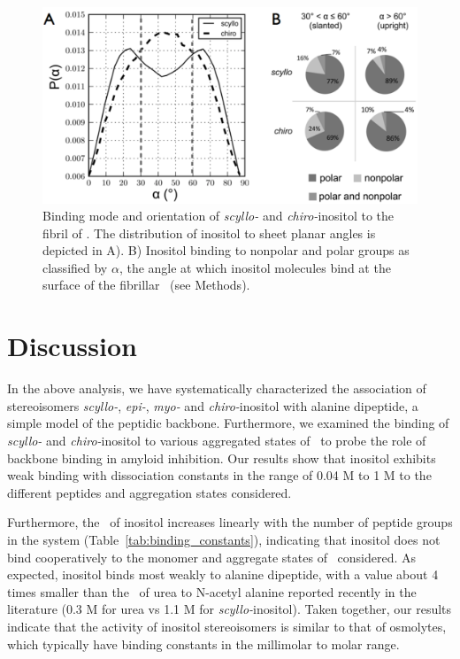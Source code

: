 \begin{figure}[htbp]
  \centering
  \includegraphics[width=6in]{figures/results1/GA4_paper_figures_submitted-8-rearranged}
  \caption[Binding mode and orientation of \textit{scyllo-} and \textit{chiro-}inositol to the fibril of \gafour.]{Binding mode and orientation of \textit{scyllo-} and \textit{chiro-}inositol to the fibril of \gafour. The distribution of inositol to sheet planar angles is depicted in A). B) Inositol binding to nonpolar and polar groups as classified by $\alpha$, the angle at which inositol molecules bind at the surface of the fibrillar \gafour\ (see Methods).}
   \label{fig:figure8}
\end{figure}

\section{Discussion}
In the above analysis, we have systematically characterized the association of stereoisomers \textit{scyllo-}, \textit{epi-}, \textit{myo-} and \textit{chiro-}inositol with alanine dipeptide, a simple model of the peptidic backbone. Furthermore, we examined the binding of \textit{scyllo-} and \textit{chiro-}inositol to various aggregated states of \gafour\ to probe the role of backbone binding in amyloid inhibition. Our results show that inositol exhibits weak binding with dissociation constants in the range of 0.04 M to 1 M to the different peptides and aggregation states considered.

Furthermore, the \KD\ of inositol increases linearly with the number of peptide groups in the system (Table~\ref{tab:binding_constants}), indicating that inositol does not bind cooperatively to the monomer and aggregate states of \gafour\ considered. As expected, inositol binds most weakly to alanine dipeptide, with a value about 4 times smaller than the \KD\ of urea to N-acetyl alanine reported recently in the literature (0.3 M for urea\cite{Lee:2010p59} vs 1.1 M for \textit{scyllo-}inositol). Taken together, our results indicate that the activity of inositol stereoisomers is similar to that of osmolytes, which typically have binding constants in the millimolar to molar range.\cite{Rosgen:2007p90,Street:2006p21}

